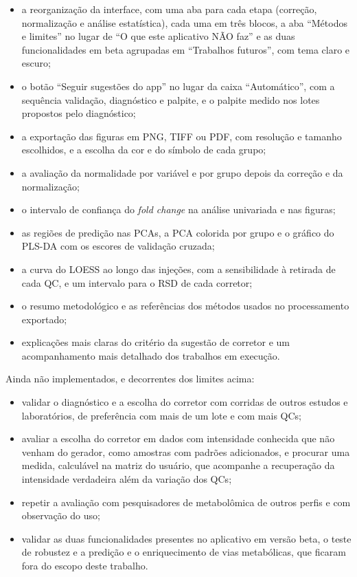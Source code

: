 \begin{itemize}
\item a reorganização da interface, com uma aba para cada etapa (correção, normalização e análise estatística), cada uma em três blocos, a aba ``Métodos e limites'' no lugar de ``O que este aplicativo NÃO faz'' e as duas funcionalidades em beta agrupadas em ``Trabalhos futuros'', com tema claro e escuro;
\item o botão ``Seguir sugestões do app'' no lugar da caixa ``Automático'', com a sequência validação, diagnóstico e palpite, e o palpite medido nos lotes propostos pelo diagnóstico;
\item a exportação das figuras em PNG, TIFF ou PDF, com resolução e tamanho escolhidos, e a escolha da cor e do símbolo de cada grupo;
\item a avaliação da normalidade por variável e por grupo depois da correção e da normalização;
\item o intervalo de confiança do \textit{fold change} na análise univariada e nas figuras;
\item as regiões de predição nas PCAs, a PCA colorida por grupo e o gráfico do PLS-DA com os escores de validação cruzada;
\item a curva do LOESS ao longo das injeções, com a sensibilidade à retirada de cada QC, e um intervalo para o RSD de cada corretor;
\item o resumo metodológico e as referências dos métodos usados no processamento exportado;
\item explicações mais claras do critério da sugestão de corretor e um acompanhamento mais detalhado dos trabalhos em execução.
\end{itemize}

Ainda não implementados, e decorrentes dos limites acima:

\begin{itemize}
\item validar o diagnóstico e a escolha do corretor com corridas de outros estudos e laboratórios, de preferência com mais de um lote e com mais QCs;
\item avaliar a escolha do corretor em dados com intensidade conhecida que não venham do gerador, como amostras com padrões adicionados, e procurar uma medida, calculável na matriz do usuário, que acompanhe a recuperação da intensidade verdadeira além da variação dos QCs;
\item repetir a avaliação com pesquisadores de metabolômica de outros perfis e com observação do uso;
\item validar as duas funcionalidades presentes no aplicativo em versão beta, o teste de robustez e a predição e o enriquecimento de vias metabólicas, que ficaram fora do escopo deste trabalho.
\end{itemize}
